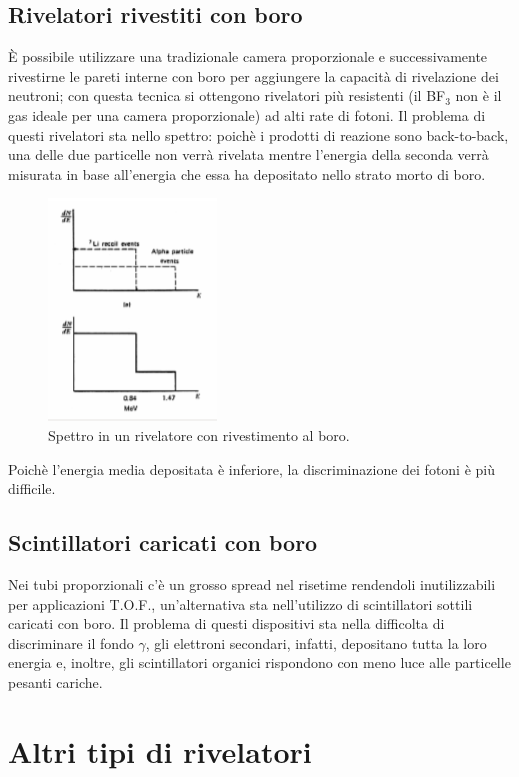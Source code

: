\subsection{Rivelatori rivestiti con boro}
\`E possibile utilizzare una tradizionale camera proporzionale e successivamente rivestirne le pareti interne con boro per aggiungere la capacit\`a di
rivelazione dei neutroni; con questa tecnica si ottengono rivelatori pi\`u resistenti (il BF$_3$ non \`e il gas ideale per una camera proporzionale) ad alti rate di fotoni.
Il problema di questi rivelatori sta nello spettro: poich\`e i prodotti di reazione sono back-to-back, una delle due particelle non verr\`a rivelata
mentre l'energia della seconda verr\`a misurata in base all'energia che essa ha depositato nello strato morto di boro.
\begin{figure}[htbp]
\begin{center}
\includegraphics[scale=1]{./Immagini/SpettroRivestimentoBoro.png}
\caption{Spettro in un rivelatore con rivestimento al boro.}
\end{center}
\end{figure}
Poich\`e l'energia media depositata \`e inferiore, la discriminazione dei fotoni \`e pi\`u difficile.
\subsection{Scintillatori caricati con boro}
Nei tubi proporzionali c'\`e un grosso spread nel risetime rendendoli inutilizzabili per applicazioni T.O.F., un'alternativa sta nell'utilizzo di
scintillatori sottili caricati con boro.
Il problema di questi dispositivi sta nella difficolta di discriminare il fondo $\gamma$, gli elettroni secondari, infatti, depositano tutta la loro energia
e, inoltre, gli scintillatori organici rispondono con meno luce alle particelle pesanti cariche.
\section{Altri tipi di rivelatori}
